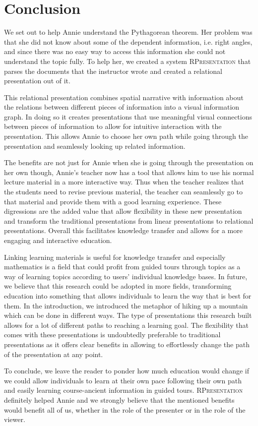 \documentclass{llncs}
\newcommand{\sys}{\textsc{RPresentation}\xspace}
\begin{document}
\section{Conclusion}
\label{sec:conclusion}

We set out to help Annie understand the Pythagorean theorem. Her problem was that she did not know about some of the dependent information, i.e. right angles, and since there was no easy way to access this information she could not understand the topic fully. To help her, we created a system \sys that parses the documents that the instructor wrote and created a relational presentation out of it.

This relational presentation combines spatial narrative with information about the relations between different pieces of information into a visual information graph. In doing so it creates presentations that use meaningful visual connections between pieces of information to allow for intuitive interaction with the presentation. This allows Annie to choose her own path while going through the presentation and seamlessly looking up related information.

The benefits are not just for Annie when she is going through the presentation on her own though, Annie's teacher now has a tool that allows him to use his normal lecture material in a more interactive way. Thus when the teacher realizes that the students need to revise previous material, the teacher can seamlessly go to that material and provide them with a good learning experience. These digressions are the added value that allow flexibility in these new presentation and transform the traditional presentations from linear presentations to relational presentations. Overall this facilitates knowledge transfer and allows for a more engaging and interactive education.

Linking learning materials is useful for knowledge transfer and especially mathematics is a field that could profit from guided tours through topics as a way of learning topics according to users' individual knowledge bases. In future, we believe that this research could be adopted in more fields, transforming education into something that allows individuals to learn the way that is best for them. In the introduction, we introduced the metaphor of hiking up a mountain which can be done in different ways. The type of presentations this research built allows for a lot of different paths to reaching a learning goal. The flexibility that comes with these presentations is undoubtedly preferable to traditional presentations as it offers clear benefits in allowing to effortlessly change the path of the presentation at any point.

To conclude, we leave the reader to ponder how much education would change if we could allow individuals to learn at their own pace following their own path and easily learning course-ancient information in guided tours. \sys definitely helped Annie and we strongly believe that the mentioned benefits would benefit all of us, whether in the role of the presenter or in the role of the viewer.




\end{document}
